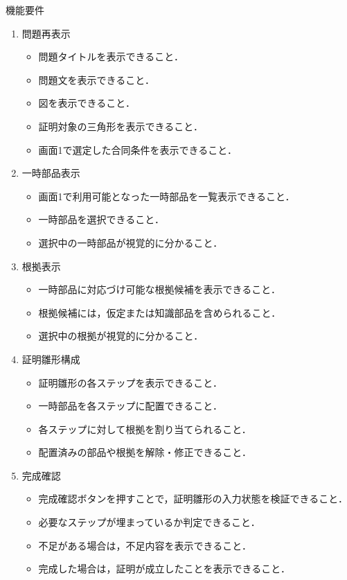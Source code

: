 \documentclass[a4paper,12pt]{ltjsarticle}
\begin{document}
機能要件
\begin{enumerate}
  \item 問題再表示
  \begin{itemize}
    \item 問題タイトルを表示できること．
    \item 問題文を表示できること．
    \item 図を表示できること．
    \item 証明対象の三角形を表示できること．
    \item 画面1で選定した合同条件を表示できること．\\
  \end{itemize}
  \item 一時部品表示
  \begin{itemize}
    \item 画面1で利用可能となった一時部品を一覧表示できること．
    \item 一時部品を選択できること．
    \item 選択中の一時部品が視覚的に分かること．\\
  \end{itemize}
  \item 根拠表示
  \begin{itemize}
    \item 一時部品に対応づけ可能な根拠候補を表示できること．
    \item 根拠候補には，仮定または知識部品を含められること．
    \item 選択中の根拠が視覚的に分かること．\\
  \end{itemize}
  \item 証明雛形構成
  \begin{itemize}
    \item 証明雛形の各ステップを表示できること．
    \item 一時部品を各ステップに配置できること．
    \item 各ステップに対して根拠を割り当てられること．
    \item 配置済みの部品や根拠を解除・修正できること．\\
  \end{itemize}
  \item 完成確認
  \begin{itemize}
    \item 完成確認ボタンを押すことで，証明雛形の入力状態を検証できること．
    \item 必要なステップが埋まっているか判定できること．
    \item 不足がある場合は，不足内容を表示できること．
    \item 完成した場合は，証明が成立したことを表示できること．\\
  \end{itemize}
\end{enumerate}
\newpage
\end{document}
